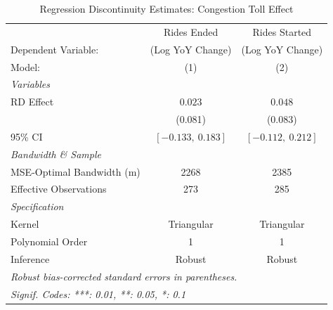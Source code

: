 
\begin{table}[htbp]
   \caption{\label{tab:rdd_main} Regression Discontinuity Estimates: Congestion Toll Effect}
   \centering
   \begin{tabular}{lcc}
      \tabularnewline \midrule \midrule
                                    & Rides Ended         & Rides Started \\
      Dependent Variable:           & (Log YoY Change)    & (Log YoY Change) \\
      Model:                        & (1)                 & (2)\\
      \midrule
      \emph{Variables}\\
      RD Effect               &  $0.023$           &  $0.048$ \\
                              &  (0.081)             &  (0.083)    \\
      95\% CI               &  $[-0.133,\ 0.183]$  &  $[-0.112,\ 0.212]$ \\
      \midrule
      \emph{Bandwidth \& Sample}\\
      MSE-Optimal Bandwidth (m) &  2268  &  2385 \\
      Effective Observations    &  273  &  285 \\
      \midrule
      \emph{Specification}\\
      Kernel                          & Triangular  & Triangular \\
      Polynomial Order                & 1           & 1 \\
      Inference                       & Robust      & Robust \\
      \midrule \midrule
      \multicolumn{3}{l}{\emph{Robust bias-corrected standard errors in parentheses.}}\\
      \multicolumn{3}{l}{\emph{Signif. Codes: ***: 0.01, **: 0.05, *: 0.1}}\\
   \end{tabular}
\end{table}

